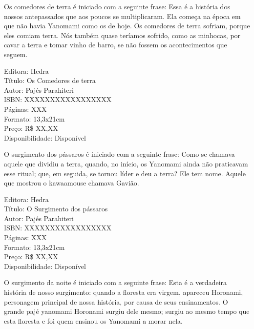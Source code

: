 \pagebreak


\noindent{}Os comedores de terra é iniciado com a seguinte frase: Essa é a história dos nossos antepassados que aos poucos se multiplicaram. Ela começa na época em que não havia Yanomami como os de hoje. Os comedores de terra sofriam, porque eles comiam terra. Nós também quase teríamos sofrido, como as minhocas, por cavar a terra e tomar vinho de barro, se não fossem os acontecimentos que seguem.

\begin{ficha}
Editora: Hedra\\
Título: Os Comedores de terra\\
Autor:  Pajés Parahiteri\\ 
ISBN: XXXXXXXXXXXXXXXXX\\
Páginas: XXX\\
Formato: 13,3x21cm\\
Preço: R\$ XX,XX\\
Disponibilidade: Disponível
\end{ficha}

\pagebreak


\noindent{}O surgimento dos pássaros é iniciado com a seguinte frase: Como se chamava aquele que dividiu a terra, quando, no início, os Yanomami ainda não praticavam esse ritual; que, em seguida, se tornou líder e deu a terra? Ele tem nome. Aquele que mostrou o kawaamouse chamava Gavião.

\begin{ficha}
Editora: Hedra\\
Título: O Surgimento dos pássaros\\
Autor:  Pajés Parahiteri\\ 
ISBN: XXXXXXXXXXXXXXXXX\\
Páginas: XXX\\
Formato: 13,3x21cm\\
Preço: R\$ XX,XX\\
Disponibilidade: Disponível
\end{ficha}

\pagebreak


\noindent{}O surgimento da noite é iniciado com a seguinte frase: Esta é a verdadeira história de nosso surgimento: quando a floresta era virgem, apareceu Horonami, personagem principal de nossa história, por causa de seus ensinamentos. O grande pajé yanomami Horonami surgiu dele mesmo; surgiu ao mesmo tempo que esta floresta e foi quem ensinou os Yanomami a morar nela.

